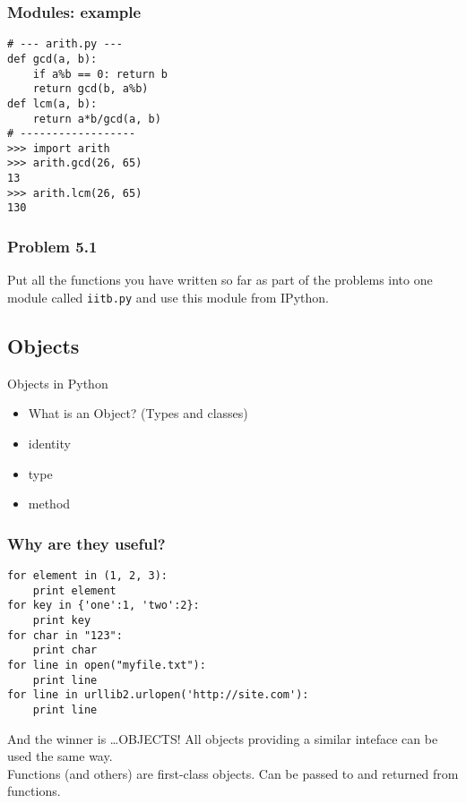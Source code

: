 \documentclass[14pt,compress]{beamer}
\newcounter{time}
\newcommand{\inctime}[1]{\addtocounter{time}{#1}{\tiny \thetime\ m}}
\newcommand{\typ}[1]{\texttt{#1}}
\begin{document}
\begin{frame}[fragile]
  \frametitle{Modules: example}
  \begin{lstlisting}
# --- arith.py ---
def gcd(a, b):
    if a%b == 0: return b
    return gcd(b, a%b)
def lcm(a, b):
    return a*b/gcd(a, b)
# ------------------
>>> import arith
>>> arith.gcd(26, 65)
13
>>> arith.lcm(26, 65)
130
  \end{lstlisting}
\end{frame}

\begin{frame}[fragile]
  \frametitle{Problem 5.1}

  Put all the functions you have written so far as part of the problems
  into one module called \typ{iitb.py} and use this module from IPython.

\inctime{20}
\end{frame}

\subsection{Objects}
\begin{frame}{Objects in Python}
    \begin{itemize}
        \item What is an Object? (Types and classes)
        \item identity
        \item type
        \item method
      \end{itemize}
\end{frame}

\begin{frame}[fragile]
  \frametitle{Why are they useful?}
  \small
  \begin{lstlisting}
for element in (1, 2, 3):
    print element
for key in {'one':1, 'two':2}:
    print key
for char in "123":
    print char
for line in open("myfile.txt"):
    print line
for line in urllib2.urlopen('http://site.com'):
    print line
  \end{lstlisting}
\end{frame}
\begin{frame}{And the winner is \ldots OBJECTS!}
  All objects providing a similar inteface can be used the same way.\\
  Functions (and others) are first-class objects. Can be passed to and returned from functions.
  \inctime{10}
\end{frame}
\end{document}
